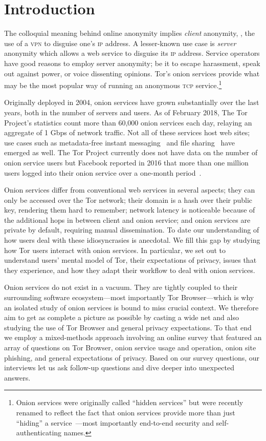 \section{Introduction}
\label{sec:introduction}

The colloquial meaning behind online anonymity implies \emph{client} anonymity,
\eg, the use of a \textsc{vpn} to disguise one's \textsc{ip} address.  A
lesser-known use case is \emph{server} anonymity which allows a web service to
disguise its \textsc{ip} address.  Service operators have good reasons to employ
server anonymity; be it to escape harassment, speak out against power, or voice
dissenting opinions.  Tor's onion services provide what may be the most popular
way of running an anonymous \textsc{tcp} service.\footnote{Onion services were
originally called ``hidden services'' but were recently renamed to reflect the
fact that onion services provide more than just ``hiding'' a
service~\cite{Johnson2015a}---most importantly end-to-end security and
self-authenticating names.}

Originally deployed in 2004, onion services have grown substantially over the
last years, both in the number of servers and users.  As of February 2018, The
Tor Project's statistics count more than 60,000 onion services each day,
relaying an aggregate of 1 Gbps of network traffic.  Not all of these services
host web sites; use cases such as metadata-free instant
messaging~\cite{ricochet} and file sharing~\cite{onionshare} have emerged as
well.  The Tor Project currently does not have data on the number of onion
service users but Facebook reported in 2016 that more than one million users
logged into their onion service over a one-month period~\cite{facebook-users}.

Onion services differ from conventional web services in several aspects; \first
they can only be accessed over the Tor network; \second their domain is a hash
over their public key, rendering them hard to remember; \third network latency
is noticeable because of the additional hops in between client and onion
service; and \fourth onion services are private by default, requiring manual
dissemination.  To date our understanding of how users deal with these
idiosyncrasies is anecdotal.  We fill this gap by studying how Tor users
interact with onion services.  In particular, we set out to understand users'
mental model of Tor, their expectations of privacy, issues that they experience,
and how they adapt their workflow to deal with onion services.

Onion services do not exist in a vacuum.  They are tightly coupled to their
surrounding software ecosystem---most importantly Tor Browser---which is why an
isolated study of onion services is bound to miss crucial context.  We therefore
aim to get as complete a picture as possible by casting a wide net and also
studying the use of Tor Browser and general privacy expectations.  To that end
we employ a mixed-methods approach involving an online survey that featured an
array of questions on Tor Browser, onion service usage and operation, onion site
phishing, and general expectations of privacy.  Based on our survey questions,
our interviews let us ask follow-up questions and dive deeper into unexpected
answers.

